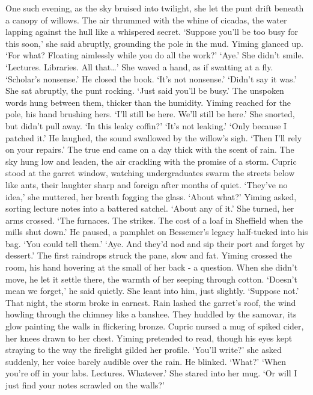 One such evening, as the sky bruised into twilight, she let the punt drift beneath a canopy of willows. The air thrummed with the whine of cicadas, the water lapping against the hull like a whispered secret.
`Suppose you'll be too busy for this soon,' she said abruptly, grounding the pole in the mud.
Yiming glanced up. `For what? Floating aimlessly while you do all the work?'
`Aye.' She didn't smile. `Lectures. Libraries. All that…' She waved a hand, as if swatting at a fly. `Scholar's nonsense.'
He closed the book. `It's not nonsense.'
`Didn't say it was.' She sat abruptly, the punt rocking. `Just said you'll be busy.'
The unspoken words hung between them, thicker than the humidity. Yiming reached for the pole, his hand brushing hers. `I'll still be here. We'll still be here.'
She snorted, but didn't pull away. `In this leaky coffin?'
`It's not leaking.'
`Only because I patched it.'
He laughed, the sound swallowed by the willow's sigh. `Then I'll rely on your repairs.'
The true end came on a day thick with the scent of rain. The sky hung low and leaden, the air crackling with the promise of a storm. Cupric stood at the garret window, watching undergraduates swarm the streets below like ants, their laughter sharp and foreign after months of quiet.
`They've no idea,' she muttered, her breath fogging the glass.
`About what?' Yiming asked, sorting lecture notes into a battered satchel.
`About any of it.' She turned, her arms crossed. `The furnaces. The strikes. The cost of a loaf in Sheffield when the mills shut down.'
He paused, a pamphlet on Bessemer's legacy half-tucked into his bag. `You could tell them.'
`Aye. And they'd nod and sip their port and forget by dessert.'
The first raindrops struck the pane, slow and fat. Yiming crossed the room, his hand hovering at the small of her back - a question. When she didn't move, he let it settle there, the warmth of her seeping through cotton.
`Doesn't mean we forget,' he said quietly.
She leant into him, just slightly. `Suppose not.'
That night, the storm broke in earnest. Rain lashed the garret's roof, the wind howling through the chimney like a banshee. They huddled by the samovar, its glow painting the walls in flickering bronze. Cupric nursed a mug of spiked cider, her knees drawn to her chest. Yiming pretended to read, though his eyes kept straying to the way the firelight gilded her profile.
`You'll write?' she asked suddenly, her voice barely audible over the rain.
He blinked. `What?'
`When you're off in your labs. Lectures. Whatever.' She stared into her mug. `Or will I just find your notes scrawled on the walls?'
